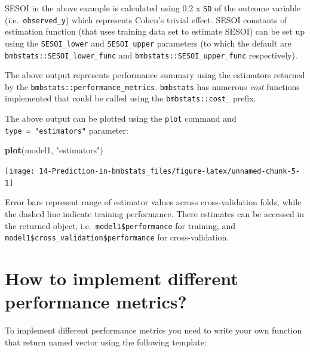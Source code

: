 \documentclass[
]{book}
\newenvironment{Shaded}{\begin{snugshade}}{\end{snugshade}}
\newcommand{\KeywordTok}[1]{\textcolor[rgb]{0.13,0.29,0.53}{\textbf{#1}}}
\newcommand{\NormalTok}[1]{#1}
\newcommand{\StringTok}[1]{\textcolor[rgb]{0.31,0.60,0.02}{#1}}
\begin{document}
SESOI in the above example is calculated using 0.2 x \texttt{SD} of the outcome variable (i.e.~\texttt{observed\_y}) which represents Cohen's trivial effect. SESOI constants of estimation function (that uses training data set to estimate SESOI) can be set up using the \texttt{SESOI\_lower} and \texttt{SESOI\_upper} parameters (to which the default are \texttt{bmbstats::SESOI\_lower\_func} and \texttt{bmbstats::SESOI\_upper\_func} respectively).

The above output represents performance summary using the estimators returned by the \texttt{bmbstats::performance\_metrics}. \texttt{bmbstats} has numerous \emph{cost} functions implemented that could be called using the \texttt{bmbstats::cost\_} prefix.

The above output can be plotted using the \texttt{plot} command and \texttt{type\ =\ "estimators"} parameter:

\begin{Shaded}
\begin{Highlighting}[]
\KeywordTok{plot}\NormalTok{(model1, }\StringTok{"estimators"}\NormalTok{)}
\end{Highlighting}
\end{Shaded}

\begin{center}\texttt{[image: 14-Prediction-in-bmbstats\_files/figure-latex/unnamed-chunk-5-1]} \end{center}

Error bars represent range of estimator values across cross-validation folds, while the dashed line indicate training performance. There estimates can be accessed in the returned object, i.e.~\texttt{model1\$performance} for training, and \texttt{model1\$cross\_validation\$performance} for cross-validation.

\hypertarget{how-to-implement-different-performance-metrics}{%
\section{How to implement different performance metrics?}\label{how-to-implement-different-performance-metrics}}

To implement different performance metrics you need to write your own function that return named vector using the following template:
\end{document}
